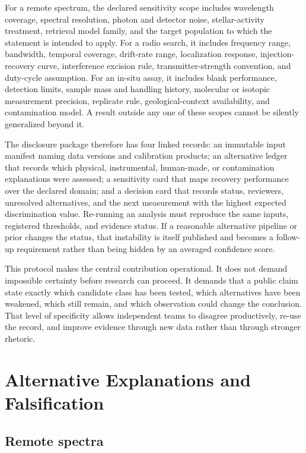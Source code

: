 \documentclass[conference]{IEEEtran}
\begin{document}
For a remote spectrum, the declared sensitivity scope includes wavelength coverage, spectral resolution, photon and detector noise, stellar-activity treatment, retrieval model family, and the target population to which the statement is intended to apply. For a radio search, it includes frequency range, bandwidth, temporal coverage, drift-rate range, localization response, injection-recovery curve, interference excision rule, transmitter-strength convention, and duty-cycle assumption. For an in-situ assay, it includes blank performance, detection limits, sample mass and handling history, molecular or isotopic measurement precision, replicate rule, geological-context availability, and contamination model. A result outside any one of these scopes cannot be silently generalized beyond it.

The disclosure package therefore has four linked records: an immutable input manifest naming data versions and calibration products; an alternative ledger that records which physical, instrumental, human-made, or contamination explanations were assessed; a sensitivity card that maps recovery performance over the declared domain; and a decision card that records status, reviewers, unresolved alternatives, and the next measurement with the highest expected discrimination value. Re-running an analysis must reproduce the same inputs, registered thresholds, and evidence status. If a reasonable alternative pipeline or prior changes the status, that instability is itself published and becomes a follow-up requirement rather than being hidden by an averaged confidence score.

This protocol makes the central contribution operational. It does not demand impossible certainty before research can proceed. It demands that a public claim state exactly which candidate class has been tested, which alternatives have been weakened, which still remain, and which observation could change the conclusion. That level of specificity allows independent teams to disagree productively, re-use the record, and improve evidence through new data rather than through stronger rhetoric.

\section{Alternative Explanations and Falsification}

\subsection{Remote spectra}
\end{document}

